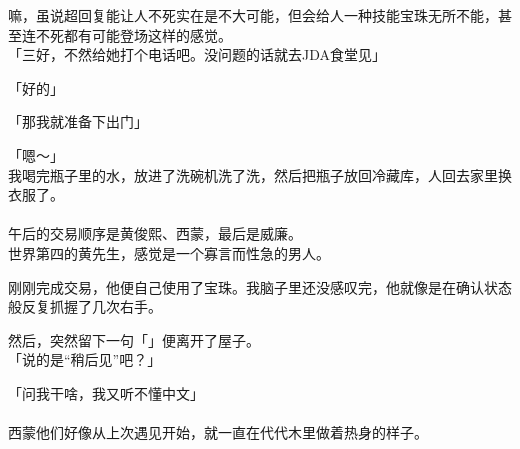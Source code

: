 嘛，虽说超回复能让人不死实在是不大可能，但会给人一种技能宝珠无所不能，甚至连不死都有可能登场这样的感觉。\\

「三好，不然给她打个电话吧。没问题的话就去JDA食堂见」

「好的」

「那我就准备下出门」

「嗯～」\\

我喝完瓶子里的水，放进了洗碗机洗了洗，然后把瓶子放回冷藏库，人回去家里换衣服了。\\

\sqsplit\\

午后的交易顺序是黄俊熙、西蒙，最后是威廉。\\

世界第四的黄先生，感觉是一个寡言而性急的男人。

刚刚完成交易，他便自己使用了宝珠。我脑子里还没感叹完，他就像是在确认状态般反复抓握了几次右手。

然后，突然留下一句「」便离开了屋子。\\

「说的是“稍后见”吧？」

「问我干啥，我又听不懂中文」\\

\sqsplit\\

西蒙他们好像从上次遇见开始，就一直在代代木里做着热身的样子。\\

